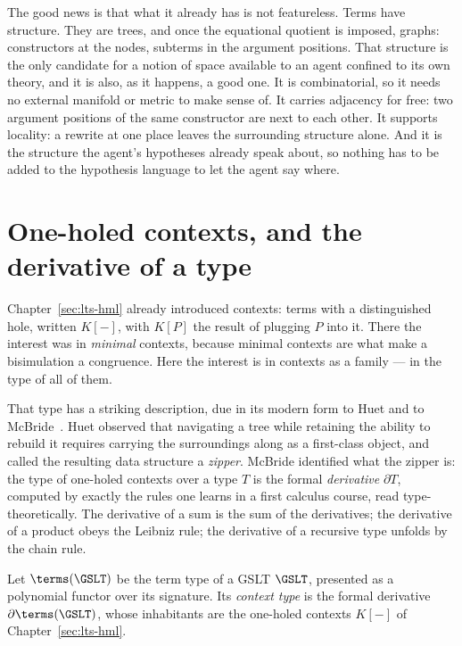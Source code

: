 The good news is that what it already has is not featureless.
Terms have structure.
They are trees, and once the equational quotient is imposed,
graphs: constructors at the nodes, subterms in the argument
positions.
That structure is the only candidate for a notion of space
available to an agent confined to its own theory, and it is also,
as it happens, a good one.
It is combinatorial, so it needs no external manifold or metric to
make sense of.
It carries adjacency for free: two argument positions of the same
constructor are next to each other.
It supports locality: a rewrite at one place leaves the
surrounding structure alone.
And it is the structure the agent's hypotheses already speak
about, so nothing has to be added to the hypothesis language to
let the agent say where.

\section{One-holed contexts, and the derivative of a type}

Chapter~\ref{sec:lts-hml} already introduced contexts: terms with
a distinguished hole, written $K[-]$, with $K[P]$ the result of
plugging $P$ into it.
There the interest was in \emph{minimal} contexts, because minimal
contexts are what make a bisimulation a congruence.
Here the interest is in contexts as a family --- in the type of
all of them.

That type has a striking description, due in its modern form to
Huet and to McBride~\cite{Huet97,McBride08}.
Huet observed that navigating a tree while retaining the ability
to rebuild it requires carrying the surroundings along as a
first-class object, and called the resulting data structure a
\emph{zipper}.
McBride identified what the zipper is: the type of one-holed
contexts over a type $T$ is the formal \emph{derivative} $\partial
T$, computed by exactly the rules one learns in a first calculus
course, read type-theoretically.
The derivative of a sum is the sum of the derivatives; the
derivative of a product obeys the Leibniz rule; the derivative of
a recursive type unfolds by the chain rule.

\begin{definition}
\label{def:dT}
Let $\terms(\GSLT)$ be the term type of a GSLT $\GSLT$, presented
as a polynomial functor over its signature.
Its \emph{context type} is the formal derivative
$\partial \terms(\GSLT)$, whose inhabitants are the one-holed
contexts $K[-]$ of Chapter~\ref{sec:lts-hml}.
\end{definition}

